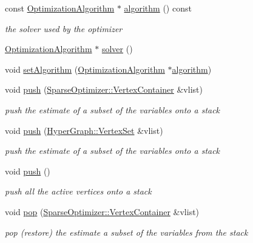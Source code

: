 \begin{DoxyCompactItemize}
\item 
const \hyperlink{classg2o_1_1OptimizationAlgorithm}{Optimization\+Algorithm} $\ast$ \hyperlink{classg2o_1_1SparseOptimizer_a7dad5beea6a44d92b1cc47c0e526a676}{algorithm} () const 
\begin{DoxyCompactList}\small\item\em the solver used by the optimizer \end{DoxyCompactList}\item 
\hyperlink{classg2o_1_1OptimizationAlgorithm}{Optimization\+Algorithm} $\ast$ \hyperlink{classg2o_1_1SparseOptimizer_aaa505e19f70caa4f0a8fe8eccdbcd768}{solver} ()
\item 
void \hyperlink{classg2o_1_1SparseOptimizer_a5ed7404ef361b479c75a0baf34e0a2bd}{set\+Algorithm} (\hyperlink{classg2o_1_1OptimizationAlgorithm}{Optimization\+Algorithm} $\ast$\hyperlink{classg2o_1_1SparseOptimizer_a7dad5beea6a44d92b1cc47c0e526a676}{algorithm})
\item 
void \hyperlink{classg2o_1_1SparseOptimizer_a08833d6f9ae487f5608f6113f3635b6b}{push} (\hyperlink{classg2o_1_1HyperGraph_a9339534c99300a0ddac87ba976ef188c}{Sparse\+Optimizer\+::\+Vertex\+Container} \&vlist)
\begin{DoxyCompactList}\small\item\em push the estimate of a subset of the variables onto a stack \end{DoxyCompactList}\item 
void \hyperlink{classg2o_1_1SparseOptimizer_ac9a5fd64764e61d99e8a90734118a8bf}{push} (\hyperlink{classg2o_1_1HyperGraph_a703938cdb4bb636860eed55a2489d70c}{Hyper\+Graph\+::\+Vertex\+Set} \&vlist)
\begin{DoxyCompactList}\small\item\em push the estimate of a subset of the variables onto a stack \end{DoxyCompactList}\item 
void \hyperlink{classg2o_1_1SparseOptimizer_a4c121d69052291775860d06507aba698}{push} ()
\begin{DoxyCompactList}\small\item\em push all the active vertices onto a stack \end{DoxyCompactList}\item 
void \hyperlink{classg2o_1_1SparseOptimizer_a57dbbb584122c6cfa292bb79d8fcd7ad}{pop} (\hyperlink{classg2o_1_1HyperGraph_a9339534c99300a0ddac87ba976ef188c}{Sparse\+Optimizer\+::\+Vertex\+Container} \&vlist)
\begin{DoxyCompactList}\small\item\em pop (restore) the estimate a subset of the variables from the stack \end{DoxyCompactList}\item 

\end{DoxyCompactItemize}
